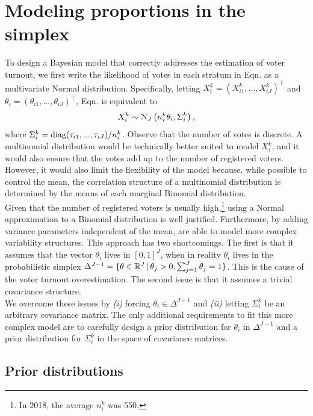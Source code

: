 \documentclass{article}
\begin{document}
\section{Modeling proportions in the simplex} \label{sec:model}


To design a Bayesian model that correctly addresses the estimation of voter turnout, we first write the likelihood of votes in each stratum in Eqn.  as a multivariate Normal distribution. Specifically, letting $X_i^k = (X_{i1}^k,..., X_{iJ}^k)^\top$ and $\theta_i = (\theta_{i1}, ..., \theta_{iJ})^\top$, Eqn.  is equivalent to
\[
  X_i^k \sim \mathcal{N}_J \left( n_i^k \theta_i, \Sigma_i^k \right),
\]
where $\Sigma_i^k = \operatorname{diag}(\tau_{i1}, ..., \tau_{iJ}) / n_i^k$. Observe that the number of votes is discrete. A multinomial distribution would be technically better suited to model $X_i^k$, and it would also ensure that the votes add up to the number of registered voters. However, it would also limit the flexibility of the model because, while possible to control the mean, the correlation structure of a multinomial distribution is determined by the means of each marginal Binomial distribution.
\\


Given that the number of registered voters is usually high,\footnote{In 2018, the average $n_i^k$ was 550.} using a Normal approximation to a Binomial distribution is well justified. Furthermore, by adding variance parameters independent of the mean, \citet{mendoza-nieto2016, diluvi2018} are able to model more complex variability structures. This approach has two shortcomings. The first is that it assumes that the vector $\theta_i$ lives in $[0, 1]^J$, when in reality $\theta_i$ lives in the probabilistic simplex $\Delta^{J-1} = \{ \theta \in \mathbb{R}^J \,|\, \theta_j > 0, \sum_{j=1}^J \theta_j = 1 \}$. This is the cause of the voter turnout overestimation. The second issue is that it assumes a trivial covariance structure.
\\


We overcome these issues by \textit{(i)} forcing $\theta_i \in \Delta^{J-1}$ and \textit{(ii)} letting $\Sigma_i^k$ be an arbitrary covariance matrix. The only additional requirements to fit this more complex model are to carefully design a prior distribution for $\theta_i$ in $\Delta^{J-1}$ and a prior distribution for $\Sigma_i^k$ in the space of covariance matrices.


\subsection{Prior distributions}
\end{document}
